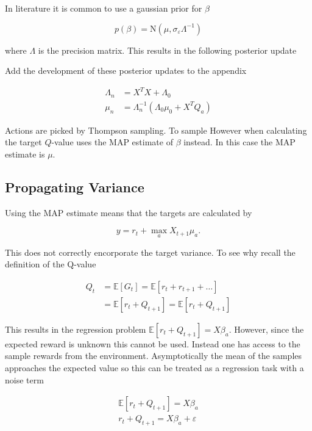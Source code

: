 In literature it is common to use a gaussian prior for $\beta$

$$
p(\beta) = \text{N}(\mu, \sigma_\varepsilon\Lambda^{-1}) 
$$

where $\Lambda$ is the precision matrix. This results in the following posterior update

\todo Add the development of these posterior updates to the appendix

\begin{equation}
    \begin{split}
        \label{eq:known_noise_posterior_update}
        \Lambda_n & = X^TX + \Lambda_0 \\
        \mu_n     & = \Lambda_n^{-1}(\Lambda_0\mu_0 + X^TQ_a)
    \end{split}
\end{equation}

Actions are picked by Thompson sampling. To sample However when calculating the target $Q$-value \cite{azziz_2018} uses the MAP estimate of $\beta$ instead. In this case the MAP estimate is $\mu$. 

\subsection{Propagating Variance}

Using the MAP estimate means that the targets are calculated by 

$$
y = r_t + \max_a X_{t+1}\mu_a.
$$

This does not correctly encorporate the target variance. To see why recall the definition of the Q-value

\begin{align*}
    Q_t &= \mathbb{E}[G_t] = \mathbb{E}[r_t + r_{t+1} + \dots] \\
    &= \mathbb{E}[r_t + Q_{t+1}] = \mathbb{E}[r_t + Q_{t+1}]
\end{align*}

This results in the regression problem $\mathbb{E}[r_t + Q_{t+1}] = X\beta_a$. However, since the expected reward is unknown this cannot be used. Instead one has access to the sample rewards from the environment. Asymptotically the mean of the samples approaches the expected value so this can be treated as a regression task with a noise term

\begin{align*}
    \mathbb{E}[r_t + Q_{t+1}] = X\beta_a \\
    r_t + Q_{t+1} = X\beta_a + \varepsilon
\end{align*}

